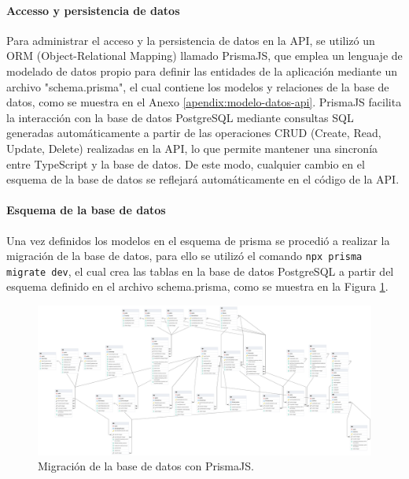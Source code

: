 \paragraph{Accesso y persistencia de datos}
Para administrar el acceso y la persistencia de datos en la API, se utilizó un ORM (Object-Relational Mapping) llamado PrismaJS, que
emplea un lenguaje de modelado de datos propio para definir las entidades de la aplicación mediante un archivo "schema.prisma", el cual
contiene los modelos y relaciones de la base de datos, como se muestra en el Anexo \ref{apendix:modelo-datos-api}. PrismaJS facilita
la interacción con la base de datos PostgreSQL mediante consultas SQL generadas automáticamente a partir de las operaciones CRUD (Create,
Read, Update, Delete) realizadas en la API, lo que permite mantener una sincronía entre TypeScript y la base de datos. De este modo,
cualquier cambio en el esquema de la base de datos se reflejará automáticamente en el código de la API.

\paragraph{Esquema de la base de datos}
Una vez definidos los modelos en el esquema de prisma se procedió a realizar la migración de la base de datos, para ello se utilizó el
comando \texttt{npx prisma migrate dev}, el cual crea las tablas en la base de datos PostgreSQL a partir del esquema definido
en el archivo schema.prisma, como se muestra en la Figura \ref{fig:migracion-base-datos}.

\begin{landscape}
    \begin{figure}[H]
        \centering
        \includegraphics[width=1.7\textwidth]{chapters/III-resultados-y-discusion/resources/images/migracion-base-datos.png}
        \caption{Migración de la base de datos con PrismaJS.}
        \label{fig:migracion-base-datos}
    \end{figure}
\end{landscape}

